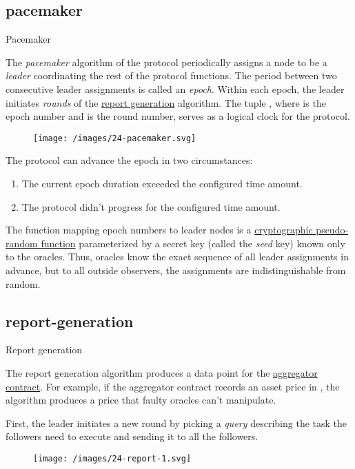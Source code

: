 \documentclass{article}
\begin{document}
\subsection{pacemaker}{Pacemaker}

The \emph{pacemaker} algorithm of the  protocol periodically assigns a node to be a \emph{leader} coordinating the rest of the protocol functions.
The period between two consecutive leader assignments is called an \emph{epoch}.
Within each epoch, the leader initiates \emph{rounds} of the \href{#report-generation}{report generation} algorithm.
The tuple , where  is the epoch number and  is the round number, serves as a logical clock for the protocol.

\begin{figure}[grayscale-diagram]
    \texttt{[image: /images/24-pacemaker.svg]}
\end{figure}

The protocol can advance the epoch in two circumstances:
\begin{enumerate}
    \item The current epoch duration exceeded the configured time amount.
    \item The protocol didn't progress for the configured time amount.
\end{enumerate}

The function mapping epoch numbers to leader nodes is a \href{https://crypto.stanford.edu/pbc/notes/crypto/prf.html}{cryptographic pseudo-random function} parameterized by a secret key (called the \emph{seed} key) known only to the oracles.
Thus, oracles know the exact sequence of all leader assignments in advance, but to all outside observers, the assignments are indistinguishable from random.

\subsection{report-generation}{Report generation}

The report generation algorithm produces a data point for the \href{#aggregator-contract}{aggregator contract}.
For example, if the aggregator contract records an asset price in , the algorithm produces a price that faulty oracles can't manipulate.

First, the leader initiates a new round by picking a \emph{query} describing the task the followers need to execute and sending it to all the followers.
\begin{figure}[grayscale-diagram,medium-size]
\texttt{[image: /images/24-report-1.svg]}
\end{figure}
\end{document}
